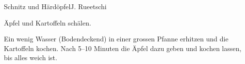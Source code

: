 
\begin{recipe}[]{Schnitz und H\"ard\"opfel}{J. Rueetschi}{}



\step%
\"Apfel und Kartoffeln sch\"alen.

\step%
Ein wenig Wasser (Bodendeckend) in einer grossen Pfanne erhitzen und die
Kartoffeln kochen. Nach 5--10 Minuten die \"Apfel dazu geben und kochen lassen,
bis alles weich ist.


\end{recipe}
